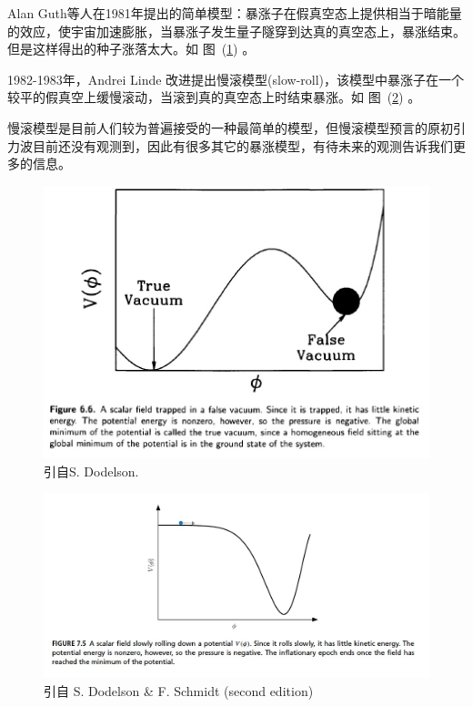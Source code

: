 \documentclass[12pt]{ctexart}
\newcommand{\reffig}[1]{图~(\ref{#1})}
\begin{document}
Alan Guth等人在1981年提出的简单模型：暴涨子在假真空态上提供相当于暗能量的效应，使宇宙加速膨胀，当暴涨子发生量子隧穿到达真的真空态上，暴涨结束。但是这样得出的种子涨落太大。如 \reffig{suichuan} 。

1982-1983年，Andrei Linde 改进提出慢滚模型(slow-roll)，该模型中暴涨子在一个较平的假真空上缓慢滚动，当滚到真的真空态上时结束暴涨。如  \reffig{slow-roll} 。

慢滚模型是目前人们较为普遍接受的一种最简单的模型，但慢滚模型预言的原初引力波目前还没有观测到，因此有很多其它的暴涨模型，有待未来的观测告诉我们更多的信息。

\begin{figure}[!hbtp]
	\centering
	\includegraphics[width=1.0\linewidth]{suichuan.jpg}
	\caption{引自S. Dodelson.} \label{suichuan}
\end{figure}

\begin{figure}[!hbtp]
	\centering
	\includegraphics[width=1.0\linewidth]{slow-roll.jpg}
	\caption{引自 S. Dodelson \& F. Schmidt (second edition)} \label{slow-roll}
\end{figure}
\end{document}
